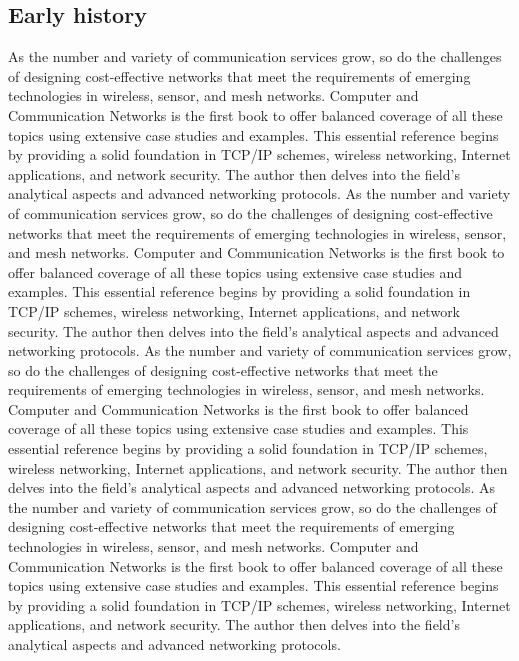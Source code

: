    \subsection{Early history}
    As the number and variety of communication services grow, so do the challenges of designing cost-effective networks that meet the requirements of emerging technologies in wireless, sensor, and mesh networks. Computer and Communication Networks is the first book to offer balanced coverage of all these topics using extensive case studies and examples.
This essential reference begins by providing a solid foundation in TCP/IP schemes, wireless networking, Internet applications, and network security. The author then delves into the field's analytical aspects and advanced networking protocols.
As the number and variety of communication services grow, so do the challenges of designing cost-effective networks that meet the requirements of emerging technologies in wireless, sensor, and mesh networks. Computer and Communication Networks is the first book to offer balanced coverage of all these topics using extensive case studies and examples.
This essential reference begins by providing a solid foundation in TCP/IP schemes, wireless networking, Internet applications, and network security. The author then delves into the field's analytical aspects and advanced networking protocols.
As the number and variety of communication services grow, so do the challenges of designing cost-effective networks that meet the requirements of emerging technologies in wireless, sensor, and mesh networks. Computer and Communication Networks is the first book to offer balanced coverage of all these topics using extensive case studies and examples.
This essential reference begins by providing a solid foundation in TCP/IP schemes, wireless networking, Internet applications, and network security. The author then delves into the field's analytical aspects and advanced networking protocols.
As the number and variety of communication services grow, so do the challenges of designing cost-effective networks that meet the requirements of emerging technologies in wireless, sensor, and mesh networks. Computer and Communication Networks is the first book to offer balanced coverage of all these topics using extensive case studies and examples.
This essential reference begins by providing a solid foundation in TCP/IP schemes, wireless networking, Internet applications, and network security. The author then delves into the field's analytical aspects and advanced networking protocols.

